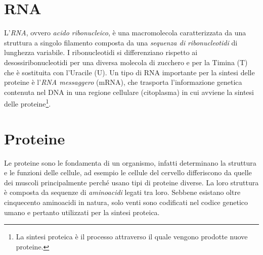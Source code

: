 \section{RNA}
L'\textit{RNA}, ovvero \textit{acido ribonucleico}, è una macromolecola caratterizzata da una struttura a singolo filamento composta da una \textit{sequenza di ribonucleotidi} di lunghezza variabile.
\newline
I ribonucleotidi si differenziano rispetto ai desossiribonucleotidi per una diversa molecola di zucchero e per la Timina (T) che è sostituita con l'Uracile (U).
\newline
Un tipo di RNA importante per la sintesi delle proteine è l'\textit{RNA messaggero} (mRNA), che trasporta l'informazione genetica contenuta nel DNA in una regione cellulare (citoplasma) in cui avviene la sintesi delle proteine\footnote{La sintesi proteica è il processo attraverso il quale vengono prodotte nuove proteine.}.

\section{Proteine}
Le proteine sono le fondamenta di un organismo, infatti determinano la struttura e le funzioni delle cellule, ad esempio le cellule del cervello differiscono da quelle dei muscoli principalmente perché usano tipi di proteine diverse.
La loro struttura è composta da sequenze di \textit{aminoacidi} legati tra loro.
\newline
Sebbene esistano oltre cinquecento aminoacidi in natura, solo venti sono codificati nel codice genetico umano e pertanto utilizzati per la sintesi proteica.
\newline